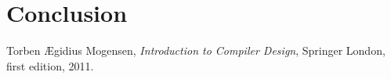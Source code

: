 \documentclass[12pt,a4paper]{article}
\begin{document}
\section{Conclusion}

\begin{thebibliography}{9}
    Torben Ægidius Mogensen,
    \emph{Introduction to Compiler Design},
    Springer London, first edition, 2011.
\end{thebibliography}
\end{document}
